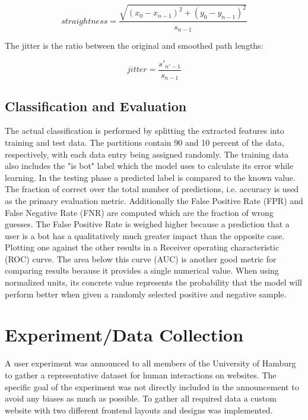 \documentclass[
    fontsize=12pt,
    headings=small,
    parskip=half,           %
    bibliography=totoc,
    numbers=noenddot,       %
    open=any,               %
    final                   %
]{scrreprt}
\begin{document}
\[
straightness = \frac{ \sqrt{ (x_0 - x_{n-1})^2 + (y_0 - y_{n-1})^2 } }{s_{n-1}}
\]

The jitter is the ratio between the original and smoothed path lengths:

\[
jitter = \frac{s'_{n'-1}}{s_{n-1}}
\]



\subsection{Classification and Evaluation}

The actual classification is performed by splitting the extracted features into training and test data. The partitions contain 90 and 10 percent of the data, respectively, with each data entry being assigned randomly. The training data also includes the "is bot" label which the model uses to calculate its error while learning. In the testing phase a predicted label is compared to the known value. The fraction of correct over the total number of predictions, i.e. accuracy is used as the primary evaluation metric. Additionally the False Positive Rate (FPR) and False Negative Rate (FNR) are computed which are the fraction of wrong guesses. The False Positive Rate is weighed higher because a prediction that a user is a bot has a qualitatively much greater impact than the opposite case. Plotting one against the other results in a Receiver operating characteristic (ROC) curve. The area below this curve (AUC) is another good metric for comparing results because it provides a single numerical value. When using normalized units, its concrete value represents the probability that the model will perform better when given a randomly selected positive and negative sample.\cite{FAWCETT2006861}


\section{Experiment/Data Collection}

A user experiment was announced to all members of the University of Hamburg to gather a representative dataset for human interactions on websites. The specific goal of the experiment was not directly included in the announcement to avoid any biases as much as possible. To gather all required data a custom website with two different frontend layouts and designs was implemented.

\end{document}
